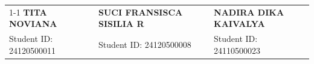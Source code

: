 \documentclass[11pt,a4paper]{article}
\begin{document}
\vspace{2.5em}
\noindent\begin{tabularx}{\linewidth}{X c X c X}
\cline{1-1} \cline{3-3} \cline{5-5}
\vspace{0.2em}\centering\textbf{TITA NOVIANA} & & \vspace{0.2em}\centering\textbf{SUCI FRANSISCA SISILIA R} & & \vspace{0.2em}\centering\textbf{NADIRA DIKA KAIVALYA} \\
\centering Student ID: 24120500011 & & \centering Student ID: 24120500008 & & \centering Student ID: 24110500023 \\
\end{tabularx}
\end{document}
